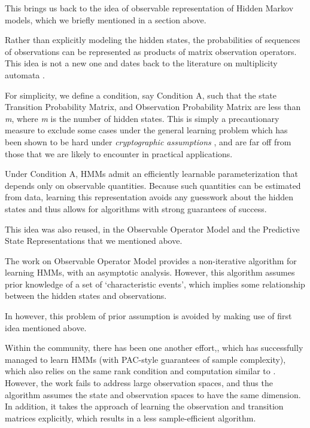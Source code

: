 This brings us back to the idea of observable representation of Hidden Markov models, which we briefly mentioned in a section above.

Rather than explicitly modeling the hidden states, the probabilities of sequences of observations can be represented as products of matrix observation operators. This idea is not a new one and dates back to
the literature on multiplicity automata \cite{ref15} \cite{ref16}.

For simplicity, we define a condition, say Condition A, such that the state Transition Probability Matrix, and Observation Probability Matrix are less than \textit{m}, where \textit{m} is the number of hidden states. This is simply a precautionary measure to exclude some cases under the general learning problem which has been shown to be hard under \textit{cryptographic assumptions} \cite{ref18}, and are far off from those that we are likely to encounter in practical applications.



Under Condition A, HMMs admit an efficiently learnable parameterization that depends
only on observable quantities. Because such quantities can be estimated from data, learning
this representation avoids any guesswork about the hidden states and thus allows for algorithms
with strong guarantees of success.


This idea was also reused, in the Observable Operator Model and the Predictive State Representations that we mentioned above.

The work on Observable Operator Model provides a non-iterative algorithm for learning HMMs, with an asymptotic analysis. 
However, this algorithm assumes prior knowledge of a set of ‘characteristic events’, which implies some relationship between the hidden states and observations.

In \cite{ref2} however, this problem of prior assumption is avoided by making use of first idea mentioned above.


Within the community, there has been one another effort,\cite{ref17},  which has successfully managed to learn HMMs (with PAC-style guarantees of sample complexity), which also relies on the same rank condition and computation similar to \cite{ref2}. However, the work fails to address large observation spaces, and thus the algorithm assumes the state and observation spaces to have the same dimension. In addition, it takes the approach of learning the observation and transition matrices explicitly, which results in a less sample-efficient algorithm.

